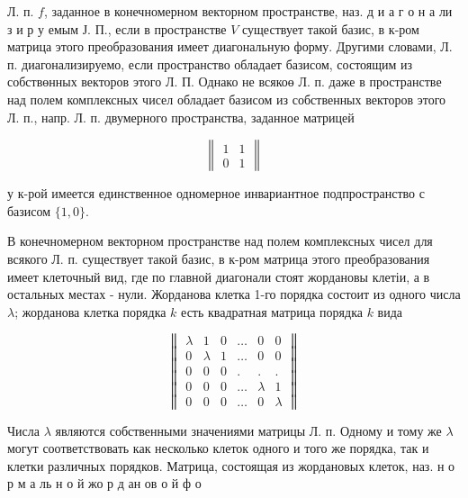 \documentclass[10pt]{article}
\begin{document}
Л. п. $f$, заданное в конечномерном векторном пространстве, наз. д и а г о н а ли з и р у емым Ј. П., если в пространстве $V$ существует такой базис, в к-ром матрица этого преобразования имеет диагональную форму. Другими словами, Л. п. диагонализируемо, если пространство обладает базисом, состоящим из собствөнных векторов этого Л. П. Однако не всякоө Л. п. даже в пространстве над полем комплексных чисел обладает базисом из собственных векторов этого Л. п., напр. Л. п. двумерного пространства, заданное матрицей



\[

\left\|\begin{array}{ll}

1 & 1 \\

0 & 1

\end{array}\right\|

\]



у к-рой имеется единственное одномерное инвариантное подпространство с базисом $\{1,0\}$.



В конечномерном векторном пространстве над полем комплексных чисел для всякого Л. п. существует такой базис, в к-ром матрица этого преобразования имеет клеточный вид, где по главной диагонали стоят жордановы клетіи, а в остальных местах - нули. Жорданова клетка 1-го порядка состоит из одного числа $\lambda$; жорданова клетка порядка $k$ есть квадратная матрица порядка $k$ вида



\[

\left\|\begin{array}{cccccc}

\lambda & 1 & 0 & \ldots & 0 & 0 \\

0 & \lambda & 1 & \ldots & 0 & 0 \\

0 & 0 & 0 & . & . & . \\

0 & 0 & 0 & \ldots & \lambda & 1 \\

0 & 0 & 0 & \ldots & 0 & \lambda

\end{array}\right\|

\]



Числа $\lambda$ являются собственными значениями матрицы Л. п. Одному и тому же $\lambda$ могут соответствовать как несколько клеток одного и того же порядка, так и клетки различных порядков. Матрица, состоящая из жордановых клеток, наз. н о р м а ль н о й жо р д ан ов о й ф о
\end{document}
